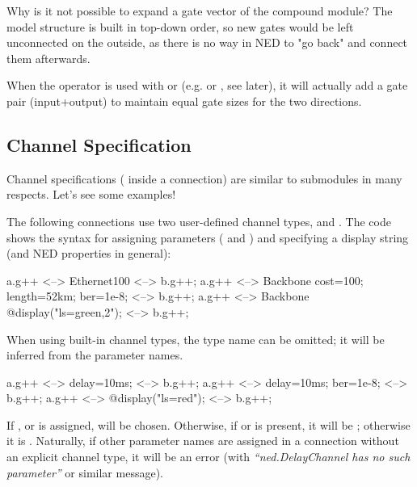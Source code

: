 \begin{note}
    Why is it not possible to expand a gate vector of the compound
    module? The model structure is built in top-down order, so new gates
    would be left unconnected on the outside, as there is no way in NED to
    "go back" and connect them afterwards.
\end{note}

When the \ttt{++} operator is used with  or 
(e.g.  or , see later), it will actually add
a gate pair (input+output) to maintain equal gate sizes for the two
directions.



\subsection{Channel Specification}
\label{sec:ned-lang:channel-specification}

Channel specifications ( inside a connection)
are similar to submodules in many respects. Let's see some examples!

The following connections use two user-defined channel types,
 and . The code shows the syntax
for assigning parameters ( and ) and specifying
a display string (and NED properties in general):

\begin{ned}
a.g++ <--> Ethernet100 <--> b.g++;
a.g++ <--> Backbone {cost=100; length=52km; ber=1e-8;} <--> b.g++;
a.g++ <--> Backbone {@display("ls=green,2");} <--> b.g++;
\end{ned}

When using built-in channel types, the type name can be omitted; it
will be inferred from the parameter names.

\begin{ned}
a.g++ <--> {delay=10ms;} <--> b.g++;
a.g++ <--> {delay=10ms; ber=1e-8;} <--> b.g++;
a.g++ <--> {@display("ls=red");} <--> b.g++;
\end{ned}

If ,  or  is assigned,
 will be chosen. Otherwise, if  or
 is present, it will be ; otherwise it
is . Naturally, if other parameter names are assigned
in a connection without an explicit channel type, it will be an error (with
\textit{``ned.DelayChannel has no such parameter''} or similar message).

